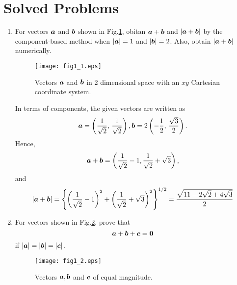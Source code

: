 \documentclass[10pt,a4j]{article}
\begin{document}
\section{Solved Problems}
\begin{enumerate}
\item
	For vectors $\mbox{\boldmath $a$}$ and $\mbox{\boldmath $b$}$ shown in Fig.\ref{fig:fig1_1}, 
	obitan $\mbox{\boldmath $a$}+\mbox{\boldmath $b$}$ and $\left| \mbox{\boldmath $a$}+\mbox{\boldmath $b$} \right|$ 
	by the component-based method when $|\mbox{\boldmath $a$}|=1$ and $|\mbox{\boldmath $b$}|=2$.
	Also, obtain $|\mbox{\boldmath $a$}+\mbox{\boldmath $b$}|$ numerically.
	\begin{figure}
		\begin{center}
		\texttt{[image: fig1\_1.eps]} 
		\end{center}
		\caption{Vectors $\mbox{\boldmath $a$}$ and $\mbox{\boldmath $b$}$ in 2 dimensional space with an $xy$ Cartesian coordinate system.}
		\label{fig:fig1_1}
	\end{figure}

	{\small
	In terms of components, the given vectors are written as 
	\[
		\mbox{\boldmath $a$}= \left( \frac{1}{\sqrt{2}}, \, \frac{1}{\sqrt{2}}\right), 
		\mbox{\boldmath $b$}=2 \left( -\frac{1}{2}, \, \frac{\sqrt{3}}{2}\right).
	\]
	Hence,
	\[
		\mbox{\boldmath $a$}+\mbox{\boldmath $b$}=\left( \frac{1}{\sqrt{2}}-1, \frac{1}{\sqrt{2}}+\sqrt{3}\right),
	\]
	and 
	\[
		| \mbox{\boldmath $a$}+\mbox{\boldmath $b$}| = 
		\left\{
		\left( \frac{1}{\sqrt{2}}-1\right)^2 +
		\left( \frac{1}{\sqrt{2}}+\sqrt{3}\right)^2
		\right\}^{1/2}
		=
		\frac{\sqrt{11-2\sqrt{2}+4\sqrt{3}}}{2}
	\]
	}
\item
	For vectors shown in Fig.\ref{fig:fig1_2}, prove that 
	\[
		\mbox{\boldmath $a$}+\mbox{\boldmath $b$}+\mbox{\boldmath $c$}=\mbox{\boldmath $0$}
	\]
	if $|\mbox{\boldmath $a$}|=|\mbox{\boldmath $b$}|=|\mbox{\boldmath $c$}|$.\\
	\begin{figure}[h]
	\begin{center}
		\texttt{[image: fig1\_2.eps]} 
		\end{center}
		\caption{Vectors $\mbox{\boldmath $a$}, \mbox{\boldmath $b$}$ and $\mbox{\boldmath $c$}$ of equal magnitude.} 
		\label{fig:fig1_2}
	\end{figure}


\end{enumerate}
\end{document}
